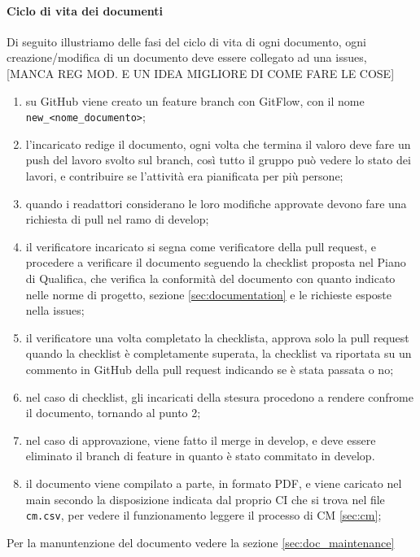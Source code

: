         \paragraph{Ciclo di vita dei documenti} \label{sec:doc_life_cycle}
            Di seguito illustriamo delle fasi del ciclo di vita di ogni documento, ogni creazione/modifica di un documento deve essere collegato ad una issues,
            [MANCA REG MOD. E UN IDEA MIGLIORE DI COME FARE LE COSE]
            \begin{enumerate}
                \item su GitHub viene creato un feature branch con GitFlow, con il nome \verb|new_<nome_documento>|;
                \item l'incaricato redige il documento, ogni volta che termina il valoro deve fare un push del lavoro svolto sul branch, così tutto il gruppo può vedere lo stato dei lavori, e contribuire se l'attività era pianificata per più persone;
                \item quando i readattori considerano le loro modifiche approvate devono fare una richiesta di pull nel ramo di develop;
                \item il verificatore incaricato si segna come verificatore della pull request, e procedere a verificare il documento seguendo la checklist proposta nel Piano di Qualifica, che verifica la conformità del documento con quanto indicato nelle norme di progetto, sezione \ref{sec:documentation} e le richieste esposte nella issues;
                \item il verificatore una volta completato la checklista, approva solo la pull request quando la checklist è completamente superata, la checklist va riportata su un commento in GitHub della pull request indicando se è stata passata o no;
                \item nel caso di checklist, gli incaricati della stesura procedono a rendere confrome il documento, tornando al punto 2;
                \item nel caso di approvazione, viene fatto il merge in develop, e deve essere eliminato il branch di feature in quanto è stato commitato in develop.
                \item il documento viene compilato a parte, in formato PDF, e viene caricato nel main secondo la disposizione indicata dal proprio CI che si trova nel file \verb|cm.csv|, per vedere il funzionamento leggere il processo di CM \ref{sec:cm};
            \end{enumerate}
            Per la manuntenzione del documento vedere la sezione \ref{sec:doc_maintenance}
